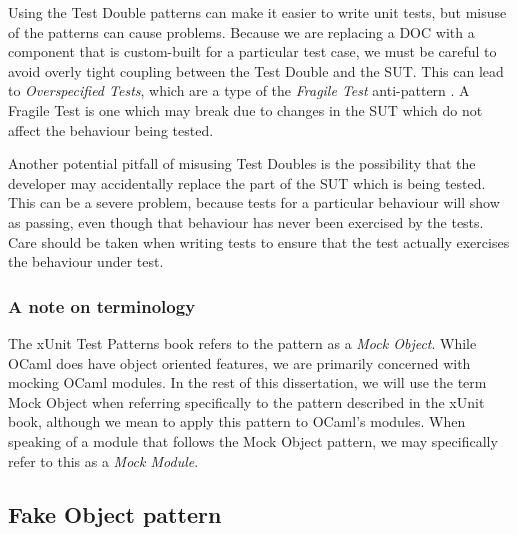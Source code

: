 Using the Test Double patterns can make it easier to write unit tests,
but misuse of the patterns can cause problems. Because we are
replacing a DOC with a component that is custom-built for a particular
test case, we must be careful to avoid overly tight coupling between
the Test Double and the SUT. This can lead to \textit{Overspecified
  Tests}, which are a type of the \textit{Fragile Test} anti-pattern
\cite{meszaros:xunit}. A Fragile Test is one which may break due to
changes in the SUT which do not affect the behaviour being tested.

Another potential pitfall of misusing Test Doubles is the possibility
that the developer may accidentally replace the part of the SUT which
is being tested. This can be a severe problem, because tests for a
particular behaviour will show as passing, even though that behaviour
has never been exercised by the tests. Care should be taken when
writing tests to ensure that the test actually exercises the
behaviour under test.

\subsubsection{A note on terminology}

The xUnit Test Patterns book refers to the pattern as a \textit{Mock
  Object}. While OCaml does have object oriented features, we are
primarily concerned with mocking OCaml modules. In the rest of this
dissertation, we will use the term Mock Object when referring
specifically to the pattern described in the xUnit book, although we
mean to apply this pattern to OCaml's modules. When speaking of a
module that follows the Mock Object pattern, we may specifically refer
to this as a \textit{Mock Module}.



\newcommand{\definition}[1]{\hangindent=1cm \textbf{#1}}

\subsection{Fake Object pattern}
\label{testdoubles:fake}

